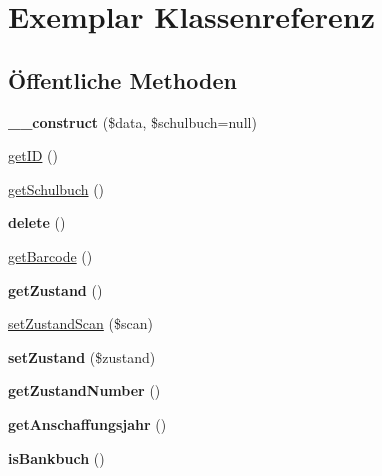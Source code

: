 \hypertarget{class_exemplar}{}\section{Exemplar Klassenreferenz}
\label{class_exemplar}
\subsection*{Öffentliche Methoden}
\begin{DoxyCompactItemize}
\item 
\mbox{\label{class_exemplar_a74c905b900a76177e3785e4bd3f098a0}} 
{\bfseries \+\_\+\+\_\+construct} (\$data, \$schulbuch=null)
\item 
\mbox{\hyperlink{class_exemplar_a3fe13dc1e6991a8506858d2a33ed0493}{get\+ID}} ()
\item 
\mbox{\hyperlink{class_exemplar_ad9c9b96e2cf33d90d90b72badf93ce0d}{get\+Schulbuch}} ()
\item 
\mbox{\label{class_exemplar_a9ad7dc1847aaed60b872d26aa8b0752d}} 
{\bfseries delete} ()
\item 
\mbox{\hyperlink{class_exemplar_ab87886d72f44247d1399b7010bf83e77}{get\+Barcode}} ()
\item 
\mbox{\label{class_exemplar_a464a00a6ad28b13a5b181835ad6f3b01}} 
{\bfseries get\+Zustand} ()
\item 
\mbox{\hyperlink{class_exemplar_aa9bfcb9754d90418616cb38fdb815307}{set\+Zustand\+Scan}} (\$scan)
\item 
\mbox{\label{class_exemplar_aa0bc3d419695a72ce987b2fa5b0aa4d9}} 
{\bfseries set\+Zustand} (\$zustand)
\item 
\mbox{\label{class_exemplar_a1edfaa8197f75fe1edc94b6099564b91}} 
{\bfseries get\+Zustand\+Number} ()
\item 
\mbox{\label{class_exemplar_a0afac04fa59b974ae18cd8a7db930e1d}} 
{\bfseries get\+Anschaffungsjahr} ()
\item 
\mbox{\label{class_exemplar_a31be1720afda969c0597aab61bce67b0}} 
{\bfseries is\+Bankbuch} ()
\item 
\mbox{\label{class_exemplar_a33e765966e1bfc30152c1620a8cb8c90}} 

\end{DoxyCompactItemize}
